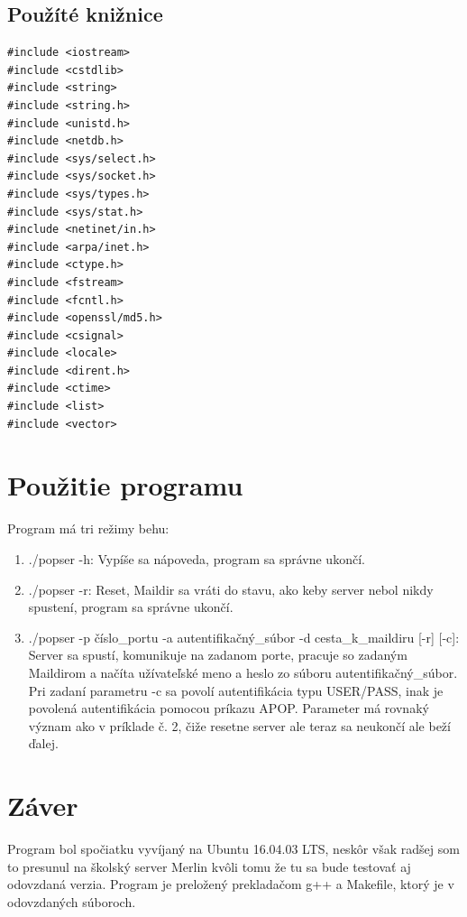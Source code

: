 \documentclass[11pt,a4paper]{article}
\begin{document}
\subsection{Použíté knižnice} 
\begin{lstlisting}
#include <iostream>
#include <cstdlib>
#include <string>
#include <string.h>
#include <unistd.h>
#include <netdb.h>
#include <sys/select.h>
#include <sys/socket.h>
#include <sys/types.h>
#include <sys/stat.h>
#include <netinet/in.h>
#include <arpa/inet.h>
#include <ctype.h>
#include <fstream>
#include <fcntl.h>
#include <openssl/md5.h>
#include <csignal>
#include <locale> 
#include <dirent.h>
#include <ctime>
#include <list>
#include <vector>
\end{lstlisting}




\section{Použitie programu}
Program má tri režimy behu:
\begin{enumerate}
  \item ./popser -h: Vypíše sa nápoveda, program sa správne ukončí.
  \item ./popser -r: Reset, Maildir sa vráti do stavu, ako keby server nebol nikdy spustení, program sa správne ukončí.
  \item ./popser -p číslo\_portu -a autentifikačný\_súbor -d  cesta\_k\_maildiru [-r] [-c]: Server sa spustí, komunikuje na zadanom porte, pracuje so zadaným Maildirom a načíta užívateľské meno a heslo zo súboru autentifikačný\_súbor. Pri zadaní parametru -c sa povolí autentifikácia typu USER/PASS, inak je povolená autentifikácia pomocou príkazu APOP. Parameter má rovnaký význam ako v príklade č. 2, čiže resetne server ale teraz sa neukončí ale beží ďalej.
\end{enumerate}



\section{Záver}
Program bol spočiatku vyvíjaný na Ubuntu 16.04.03 LTS, neskôr však radšej som to presunul na školský server Merlin kvôli tomu že tu sa bude testovať aj odovzdaná verzia.
Program je preložený prekladačom g++ a Makefile, ktorý je v odovzdaných súboroch. 


\newpage


\makeatletter
\makeatother


\begin{flushleft}

\end{flushleft}
\end{document}
